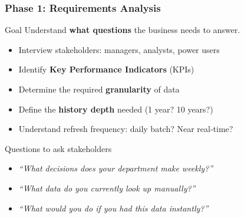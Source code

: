 \begin{frame}
  \frametitle{Phase 1: Requirements Analysis}

  \begin{block}{Goal}
    Understand \textbf{what questions} the business needs to answer.
  \end{block}

  \begin{itemize}
    \item Interview stakeholders: managers, analysts, power users
    \item Identify \textbf{Key Performance Indicators} (KPIs)
    \item Determine the required \textbf{granularity} of data
    \item Define the \textbf{history depth} needed (1 year? 10 years?)
    \item Understand refresh frequency: daily batch? Near real-time?
  \end{itemize}

  \begin{examples}{Questions to ask stakeholders}
    \begin{itemize}
      \item \textit{``What decisions does your department make weekly?''}
      \item \textit{``What data do you currently look up manually?''}
      \item \textit{``What would you do if you had this data instantly?''}
    \end{itemize}
  \end{examples}

\end{frame}

